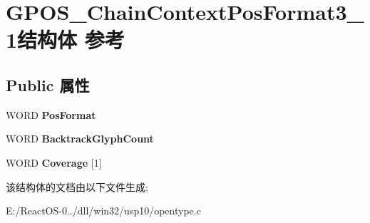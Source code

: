 \hypertarget{struct_g_p_o_s___chain_context_pos_format3__1}{}\section{G\+P\+O\+S\+\_\+\+Chain\+Context\+Pos\+Format3\+\_\+1结构体 参考}
\label{struct_g_p_o_s___chain_context_pos_format3__1}
\subsection*{Public 属性}
\begin{DoxyCompactItemize}
\item 
\mbox{\label{struct_g_p_o_s___chain_context_pos_format3__1_a4c19f02b84bba23944c63f243c815aa6}} 
W\+O\+RD {\bfseries Pos\+Format}
\item 
\mbox{\label{struct_g_p_o_s___chain_context_pos_format3__1_ae0b380fd1a5f77be38bb825991f997c6}} 
W\+O\+RD {\bfseries Backtrack\+Glyph\+Count}
\item 
\mbox{\label{struct_g_p_o_s___chain_context_pos_format3__1_ac68ed404bdec29b91a78a58327e57baa}} 
W\+O\+RD {\bfseries Coverage} \mbox{[}1\mbox{]}
\end{DoxyCompactItemize}


该结构体的文档由以下文件生成\+:\begin{DoxyCompactItemize}
\item 
E\+:/\+React\+O\+S-\/0../dll/win32/usp10/opentype.\+c\end{DoxyCompactItemize}
